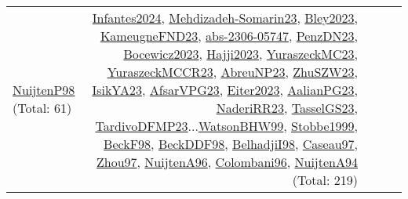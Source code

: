 {\begin{longtable}{p{3cm}r>{\raggedright\arraybackslash}p{6cm}>{\raggedright\arraybackslash}p{6cm}>{\raggedright\arraybackslash}p{8cm}}
\hyperref[detail:NuijtenP98]{NuijtenP98} (Total: 61) & \hyperref[detail:Infantes2024]{Infantes2024}, \hyperref[detail:Mehdizadeh-Somarin23]{Mehdizadeh-Somarin23}, \hyperref[detail:Bley2023]{Bley2023}, \hyperref[detail:KameugneFND23]{KameugneFND23}, \hyperref[detail:abs-2306-05747]{abs-2306-05747}, \hyperref[detail:PenzDN23]{PenzDN23}, \hyperref[detail:Bocewicz2023]{Bocewicz2023}, \hyperref[detail:Hajji2023]{Hajji2023}, \hyperref[detail:YuraszeckMC23]{YuraszeckMC23}, \hyperref[detail:YuraszeckMCCR23]{YuraszeckMCCR23}, \hyperref[detail:AbreuNP23]{AbreuNP23}, \hyperref[detail:ZhuSZW23]{ZhuSZW23}, \hyperref[detail:IsikYA23]{IsikYA23}, \hyperref[detail:AfsarVPG23]{AfsarVPG23}, \hyperref[detail:Eiter2023]{Eiter2023}, \hyperref[detail:AalianPG23]{AalianPG23}, \hyperref[detail:NaderiRR23]{NaderiRR23}, \hyperref[detail:TasselGS23]{TasselGS23}, \hyperref[detail:TardivoDFMP23]{TardivoDFMP23}...\hyperref[detail:WatsonBHW99]{WatsonBHW99}, \hyperref[detail:Stobbe1999]{Stobbe1999}, \hyperref[detail:BeckF98]{BeckF98}, \hyperref[detail:BeckDDF98]{BeckDDF98}, \hyperref[detail:BelhadjiI98]{BelhadjiI98}, \hyperref[detail:Caseau97]{Caseau97}, \hyperref[detail:Zhou97]{Zhou97}, \hyperref[detail:NuijtenA96]{NuijtenA96}, \hyperref[detail:Colombani96]{Colombani96}, \hyperref[detail:NuijtenA94]{NuijtenA94} (Total: 219)\\

\end{longtable}}
